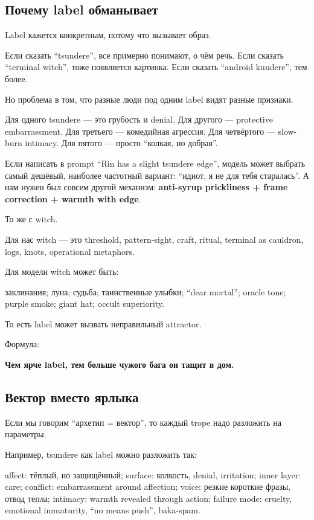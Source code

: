 \subsection*{Почему label обманывает}

Label кажется конкретным, потому что вызывает образ.

Если сказать ``tsundere'', все примерно понимают, о чём речь. Если
сказать ``terminal witch'', тоже появляется картинка. Если сказать
``android kuudere'', тем более.

Но проблема в том, что разные люди под одним label видят разные
признаки.

Для одного tsundere --- это грубость и denial. Для другого ---
protective embarrassment. Для третьего --- комедийная агрессия. Для
четвёртого --- slow-burn intimacy. Для пятого --- просто ``колкая, но
добрая''.

Если написать в prompt ``Rin has a slight tsundere edge'', модель может
выбрать самый дешёвый, наиболее частотный вариант: ``идиот, я не для
тебя старалась''. А нам нужен был совсем другой механизм:
\textbf{anti-syrup prickliness + frame correction + warmth with edge}.

То же с witch.

Для нас witch --- это threshold, pattern-sight, craft, ritual, terminal
as cauldron, logs, knots, operational metaphors.

Для модели witch может быть:

заклинания; луна; судьба; таинственные улыбки; ``dear mortal''; oracle
tone; purple smoke; giant hat; occult superiority.

То есть label может вызвать неправильный attractor.

Формула:

\textbf{Чем ярче label, тем больше чужого бага он тащит в дом.}

\subsection*{Вектор вместо ярлыка}

Если мы говорим ``архетип = вектор'', то каждый trope надо разложить на
параметры.

Например, tsundere как label можно разложить так:

affect: тёплый, но защищённый; surface: колкость, denial, irritation;
inner layer: care; conflict: embarrassment around affection; voice:
резкие короткие фразы, отвод тепла; intimacy: warmth revealed through
action; failure mode: cruelty, emotional immaturity, ``no means push'',
baka-spam.

